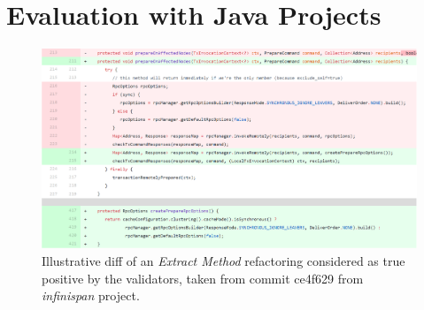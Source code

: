 \section{Evaluation with Java Projects}
\label{sec:eval:java}

\begin{figure}[htpb]
\centering
\includegraphics[width=1.0\textwidth]{img-ex-new-extract-infinispan-ce4f629.png}
\caption{Illustrative diff of an \emph{Extract Method} refactoring considered as true positive by the validators, taken from commit ce4f629 from \emph{infinispan} project.}
\label{FigDiff3}
\end{figure}


